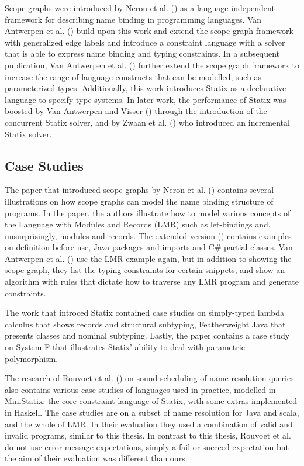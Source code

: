     Scope graphs were introduced by Neron et al. (\citeyear{Neron2015}) as a language-independent framework for describing name binding in programming languages. Van Antwerpen et al. (\citeyear{AntwerpenNTVW16}) build upon this work and extend the scope graph framework with generalized edge labels and introduce a constraint language with a solver that is able to express name binding and typing constraints. In a subsequent publication, Van Antwerpen et al. (\citeyear{VanAntwerpen2018}) further extend the scope graph framework to increase the range of language constructs that can be modelled, such as parameterized types. Additionally, this work introduces Statix as a declarative language to specify type systems. In later work, the performance of Statix was boosted by Van Antwerpen and Visser (\citeyear{AntwerpenV21}) through the introduction of the concurrent Statix solver, and by Zwaan et al. (\citeyear{ZwaanAV22}) who introduced an incremental Statix solver.

    \subsection{Case Studies}

      The paper that introduced scope graphs by Neron et al. (\citeyear{Neron2015}) contains several illustrations on how scope graphs can model the name binding structure of programs. In the paper, the authors illustrate how to model various concepts of the Language with Modules and Records (LMR) such as let-bindings and, unsurprisingly, modules and records. The extended version (\citeyear{TUD-SERG-2015-001}) contains examples on definition-before-use, Java packages and imports and C\# partial classes. Van Antwerpen et al. (\citeyear{AntwerpenNTVW16}) use the LMR example again, but in addition to showing the scope graph, they list the typing constraints for certain snippets, and show an algorithm with rules that dictate how to traverse any LMR program and generate constraints.

      The work that introced Statix \autocite{VanAntwerpen2018} contained case studies on simply-typed lambda calculus that shows records and structural subtyping, Featherweight Java that presents classes and nominal subtyping. Lastly, the paper contains a case study on System F that illustrates Statix' ability to deal with parametric polymorphism.

      The research of Rouvoet et al. (\citeyear{RouvoetAPKV20}) on sound scheduling of name resolution queries also contains various case studies of languages used in practice, modelled in MiniStatix: the core constraint language of Statix, with some extras implemented in Haskell. The case studies are on a subset of name resolution for Java and scala, and the whole of LMR. In their evaluation they used a combination of valid and invalid programs, similar to this thesis. In contrast to this thesis, Rouvoet et al. do not use error message expectations, simply a fail or succeed expectation but the aim of their evaluation was different than ours. 

